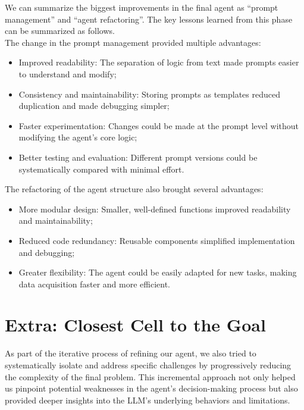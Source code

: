 We can summarize the biggest improvements in the final agent as ``prompt
management'' and ``agent refactoring''. The key lessons learned from this phase can
be summarized as follows.\\The change in the prompt management provided multiple
advantages:
\begin{itemize}
  \item Improved readability: The separation of logic from text made prompts
    easier to understand and modify;

  \item Consistency and maintainability: Storing prompts as templates reduced
    duplication and made debugging simpler;

  \item Faster experimentation: Changes could be made at the prompt level
    without modifying the agent's core logic;

  \item Better testing and evaluation: Different prompt versions could be
    systematically compared with minimal effort.
\end{itemize}
The refactoring of the agent structure also brought several advantages:
\begin{itemize}
  \item More modular design: Smaller, well-defined functions improved readability
    and maintainability;

  \item Reduced code redundancy: Reusable components simplified implementation
    and debugging;

  \item Greater flexibility: The agent could be easily adapted for new tasks, making
    data acquisition faster and more efficient.
\end{itemize}

\section{Extra: Closest Cell to the Goal}
\label{sec:closest_cell_to_the_goal}

As part of the iterative process of refining our agent, we also tried to systematically
isolate and address specific challenges by progressively reducing the complexity
of the final problem. This incremental approach not only helped us pinpoint
potential weaknesses in the agent's decision-making process but also provided
deeper insights into the LLM's underlying behaviors and limitations.

